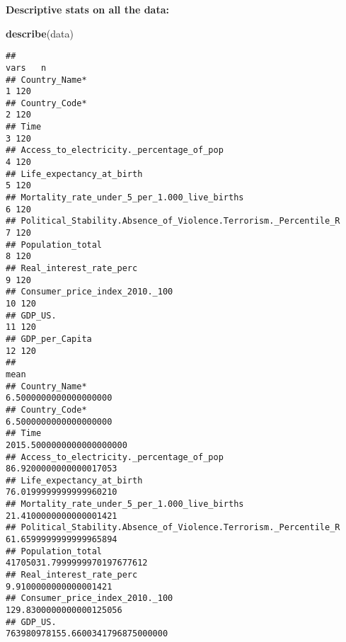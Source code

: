 \documentclass[
]{article}
\newenvironment{Shaded}{\begin{snugshade}}{\end{snugshade}}
\newcommand{\FunctionTok}[1]{\textcolor[rgb]{0.13,0.29,0.53}{\textbf{#1}}}
\newcommand{\NormalTok}[1]{#1}
\begin{document}
\textbf{Descriptive stats on all the data:}

\begin{Shaded}
\begin{Highlighting}[]
\FunctionTok{describe}\NormalTok{(data)}
\end{Highlighting}
\end{Shaded}

\begin{verbatim}
##                                                                 vars   n
## Country_Name*                                                      1 120
## Country_Code*                                                      2 120
## Time                                                               3 120
## Access_to_electricity._percentage_of_pop                           4 120
## Life_expectancy_at_birth                                           5 120
## Mortality_rate_under_5_per_1.000_live_births                       6 120
## Political_Stability.Absence_of_Violence.Terrorism._Percentile_R    7 120
## Population_total                                                   8 120
## Real_interest_rate_perc                                            9 120
## Consumer_price_index_2010._100                                    10 120
## GDP_US.                                                           11 120
## GDP_per_Capita                                                    12 120
##                                                                                             mean
## Country_Name*                                                              6.5000000000000000000
## Country_Code*                                                              6.5000000000000000000
## Time                                                                    2015.5000000000000000000
## Access_to_electricity._percentage_of_pop                                  86.9200000000000017053
## Life_expectancy_at_birth                                                  76.0199999999999960210
## Mortality_rate_under_5_per_1.000_live_births                              21.4100000000000001421
## Political_Stability.Absence_of_Violence.Terrorism._Percentile_R           61.6599999999999965894
## Population_total                                                    41705031.7999999970197677612
## Real_interest_rate_perc                                                    9.9100000000000001421
## Consumer_price_index_2010._100                                           129.8300000000000125056
## GDP_US.                                                         763980978155.6600341796875000000

\end{verbatim}
\end{document}
